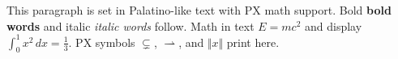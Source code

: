 \documentclass{article}
\begin{document}
This paragraph is set in Palatino-like text with PX math support.
Bold \textbf{bold words} and italic \textit{italic words} follow.
Math in text $E = mc^2$ and display $\int_0^1 x^2\,dx = \frac{1}{3}$.
PX symbols $\varsubsetneq$, $\rightharpoonup$, and $\Vert x \Vert$ print here.
\end{document}
